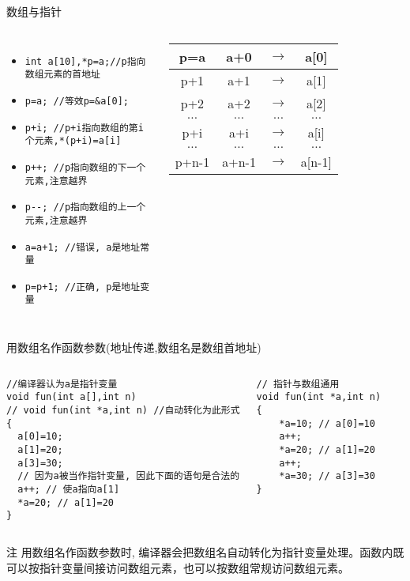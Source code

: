 \begin{frame}{数组与指针}
\begin{columns}[T]
\begin{itemize}
	\item \lstinline|int a[10],*p=a;//p指向数组元素的首地址|
	\item \lstinline|p=a; //等效p=&a[0];|
	\item \lstinline|p+i; //p+i指向数组的第i个元素,*(p+i)=a[i]|
	\item \lstinline|p++; //p指向数组的下一个元素,注意越界|
	\item \lstinline|p--; //p指向数组的上一个元素,注意越界|
	\item \lstinline|a=a+1; //错误, a是地址常量|
	\item \lstinline|p=p+1; //正确, p是地址变量|
\end{itemize}
\begin{tabular}{|c|cc|c|}
	\hline 
	p=a & a+0 &$\to$ & a[0]\\
	\hline 
	p+1 & a+1 &$\to$ & a[1]\\
	\hline 
	p+2 & a+2 &$\to$ & a[2]\\
	\hline 
	$\dots$   & $\dots$ & $\dots$ & $\dots$ \\
	\hline 
	p+i & a+i &$\to$ & a[i]\\
	\hline 
	$\dots$ & $\dots$ & $\dots$ & $\dots$ \\
	\hline 
	p+n-1 & a+n-1 &$\to$ & a[n-1]\\
	\hline 
\end{tabular}
\end{columns}
\end{frame}

\begin{frame}{用数组名作函数参数(地址传递,数组名是数组首地址)}
\vspace{-0.5cm}
\begin{columns}[T]
\begin{lstlisting}
//编译器认为a是指针变量
void fun(int a[],int n)
// void fun(int *a,int n) //自动转化为此形式
{
  a[0]=10;
  a[1]=20;
  a[3]=30;
  // 因为a被当作指针变量, 因此下面的语句是合法的
  a++; // 使a指向a[1]
  *a=20; // a[1]=20
}
\end{lstlisting}
\begin{lstlisting}[frame=leftline]
// 指针与数组通用
void fun(int *a,int n)
{
    *a=10; // a[0]=10
    a++;
    *a=20; // a[1]=20
    a++;
    *a=30; // a[3]=30
}
\end{lstlisting}
\end{columns}
\vspace{-0.2cm}
\begin{block}{注}
	\small
	用数组名作函数参数时, 编译器会把数组名自动转化为指针变量处理。函数内既可以按指针变量间接访问数组元素，也可以按数组常规访问数组元素。
\end{block}
\end{frame}

